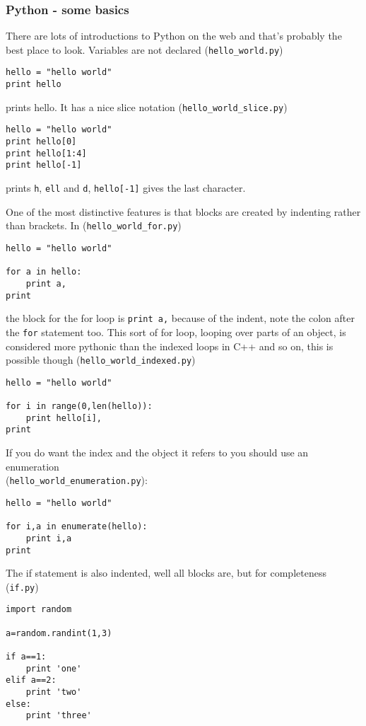 \documentclass[11pt,a4paper]{scrartcl}
\begin{document}
\subsubsection*{Python - some basics}
There are lots of introductions to Python on the web and that's
probably the best place to look. Variables are not declared (\texttt{hello\_world.py})
\begin{lstlisting}[numbers=right]
hello = "hello world"
print hello
\end{lstlisting}
prints hello. It has a nice slice notation  (\texttt{hello\_world\_slice.py})
\begin{lstlisting}[numbers=right]
hello = "hello world"
print hello[0]
print hello[1:4]
print hello[-1]
\end{lstlisting}
prints \texttt{h}, \texttt{ell} and \texttt{d}, \texttt{hello[-1]}
gives the last character. 

One of the most distinctive features is that blocks are created by
indenting rather than brackets. In  (\texttt{hello\_world\_for.py})
\begin{lstlisting}[numbers=right]
hello = "hello world"

for a in hello:
    print a,
print 
\end{lstlisting}
the block for the for loop is \texttt{print a,} because of the indent,
note the colon after the \texttt{for} statement too. This sort of for
loop, looping over parts of an object, is considered more pythonic
than the indexed loops in C++ and so on, this is possible though  (\texttt{hello\_world\_indexed.py})
\begin{lstlisting}[numbers=right]
hello = "hello world"

for i in range(0,len(hello)):
    print hello[i],
print 
\end{lstlisting}
If you do want the index and the object it refers to you should use an
enumeration\\(\texttt{hello\_world\_enumeration.py}):
\begin{lstlisting}[numbers=right]
hello = "hello world"

for i,a in enumerate(hello):
    print i,a
print 
\end{lstlisting}
The if statement is also indented, well all blocks are, but for completeness  (\texttt{if.py})
\begin{lstlisting}[numbers=right]
import random

a=random.randint(1,3)

if a==1:
    print 'one'
elif a==2:
    print 'two'
else:
    print 'three'
\end{lstlisting}
\end{document}

